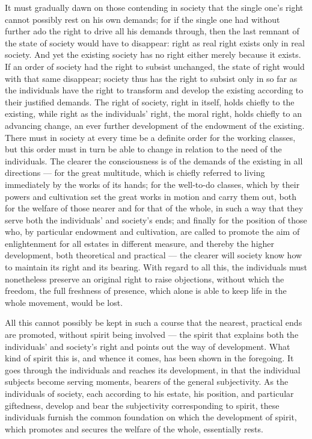 \documentclass[12pt]{book}
\begin{document}
It must gradually dawn on those contending in society that the single one's right cannot possibly
rest on his own demands; for if the single one had without further ado the right to drive all his
demands through, then the last remnant of the state of society would have to disappear: right as
real right exists only in real society. And yet the existing society has no right either merely
because it exists. If an order of society had the right to subsist unchanged, the state of right
would with that same disappear; society thus has the right to subsist only in so far as the
individuals have the right to transform and develop the existing according to their justified
demands. The right of society, right in itself, holds chiefly to the existing, while right as the
individuals' right, the moral right, holds chiefly to an advancing change, an ever further
development of the endowment of the existing. There must in society at every time be a definite
order for the working classes, but this order must in turn be able to change in relation to the
need of the individuals. The clearer the consciousness is of the demands of the existing in all
directions --- for the great multitude, which is chiefly referred to living immediately by the
works of its hands; for the well-to-do classes, which by their powers and cultivation set the great
works in motion and carry them out, both for the welfare of those nearer and for that of the whole,
in such a way that they serve both the individuals' and society's ends; and finally for the
position of those who, by particular endowment and cultivation, are called to promote the aim of
enlightenment for all estates in different measure, and thereby the higher development, both
theoretical and practical --- the clearer will society know how to maintain its right and its
bearing. With regard to all this, the individuals must nonetheless preserve an original right to
raise objections, without which the freedom, the full freshness of presence, which alone is able to
keep life in the whole movement, would be lost.

All this cannot possibly be kept in such a course that the nearest, practical ends are promoted,
without spirit being involved --- the spirit that explains both the individuals' and society's
right and points out the way of development. What kind of spirit this is, and whence it comes, has
been shown in the foregoing. It goes through the individuals and reaches its development, in that
the individual subjects become serving moments, bearers of the general subjectivity. As the
individuals of society, each according to his estate, his position, and particular giftedness,
develop and bear the subjectivity corresponding to spirit, these individuals furnish the common
foundation on which the development of spirit, which promotes and secures the welfare of the whole,
essentially rests.
\end{document}
